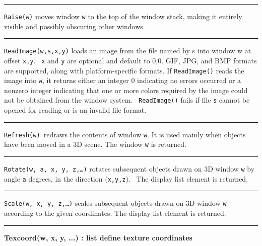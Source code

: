 \bigskip\hrule\vspace{0.1cm}

\noindent
\texttt{Raise(w)} moves window \texttt{w} to the top of the window
stack, making it entirely visible and possibly obscuring other windows.

\bigskip\hrule\vspace{0.1cm}

\noindent
\texttt{ReadImage(w,s,x,y)} loads an image from the file named by s into
window w at offset \texttt{x,y}. \texttt{\ x} and \texttt{y} are
optional and default to 0,0. GIF, JPG, and BMP formats are supported,
along with platform-specific formats. If \texttt{ReadImage()} reads the
image into \texttt{w}, it returns either an integer 0 indicating no
errors occurred or a nonzero integer indicating that one or more colors
required by the image could not be obtained from the window system.
\ \texttt{ReadImage()} fails if file \texttt{s} cannot be opened for
reading or is an invalid file format.

\bigskip\hrule\vspace{0.1cm}

\noindent
\texttt{Refresh(w) }redraws the contents of window \texttt{w}. It is
used mainly when objects have been moved in a 3D scene. The window
\texttt{w} is returned. 

\bigskip\hrule\vspace{0.1cm}

\noindent
\texttt{Rotate(w, a, x, y, z,{\dots})} rotates subsequent objects drawn
on 3D window \texttt{w} by angle \texttt{a} degrees, in the direction
(\texttt{x,y,z}). \ The display list element is returned.

\bigskip\hrule\vspace{0.1cm}

\noindent
\texttt{Scale(w, x, y, z,{\dots})} scales subsequent objects drawn on 3D
window \texttt{w} according to the given coordinates. The display list
element is returned.

\bigskip\hrule\vspace{0.1cm}
\noindent
{\bf Texcoord(w, x, y, ...) : list \hfill define texture coordinates}

